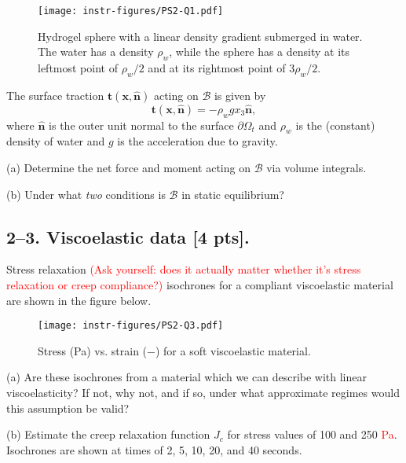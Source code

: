 \begin{figure}[H]
\vspace{-2em}
\centering
\texttt{[image: instr-figures/PS2-Q1.pdf]}
\caption{\small{Hydrogel sphere with a linear density gradient submerged in water. The water has a density $\rho_w$, while the sphere has a density at its leftmost point of $\rho_w/2$ and at its rightmost point of $3\rho_w/2$.}}
\end{figure}

\vspace{-1em}
The surface traction $\bm{t}(\bm{x},\hat{\bm{n}})$ acting on $\mathcal{B}$ is given by 
\begin{equation*}
\bm{t}(\bm{x},\hat{\bm{n}}) = -\rho_w g x_3 \hat{\bm{n}},
\end{equation*}
where $\hat{\bm{n}}$ is the outer unit normal to the surface $\partial \Omega_t$ and $\rho_w$ is the (constant) density of water and $g$ is the acceleration due to gravity. 

\medskip
(a) Determine the net force and moment acting on $\mathcal{B}$ via volume integrals.

\medskip
(b) Under what \textit{two} conditions is $\mathcal{B}$ in static equilibrium?


\bigskip
\subsection*{2--3. \textbf{Viscoelastic data} [4 pts].} 
Stress relaxation \textcolor{red}{(Ask yourself: does it actually matter whether it's stress relaxation or creep compliance?)} isochrones for a compliant viscoelastic material are shown in the figure below.  

\begin{figure}[H]
\vspace{-1em}
\centering
\texttt{[image: instr-figures/PS2-Q3.pdf]}
\caption{\small{Stress (Pa) vs. strain ($-$) for a soft viscoelastic material.}}
\end{figure}

\vspace{-1em}
(a) Are these isochrones from a material which we can describe with linear viscoelasticity? If not, why not, and if so, under what approximate regimes would this assumption be valid? 

\medskip
(b) Estimate the creep relaxation function $J_c$ for stress values of 100 and 250 \textcolor{red}{Pa}. Isochrones are shown at times of 2, 5, 10, 20, and 40 seconds.   

